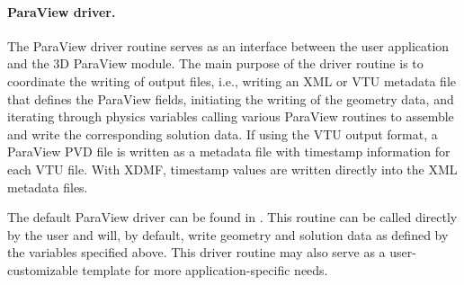 \paragraph{ParaView driver.}
The ParaView driver routine serves as an interface between the user application and the \hp3D ParaView module. The main purpose of the driver routine is to coordinate the writing of output files, i.e., writing an XML or VTU metadata file that defines the ParaView fields, initiating the writing of the geometry data, and iterating through physics variables calling various ParaView routines to assemble and write the corresponding solution data. If using the VTU output format, a ParaView PVD file is written as a metadata file with timestamp information for each VTU file. With XDMF, timestamp values are written directly into the XML metadata files.

The default ParaView driver can be found in . This  routine can be called directly by the user and will, by default, write geometry and solution data as defined by the variables specified above. This driver routine may also serve as a user-customizable template for more application-specific needs.

%

